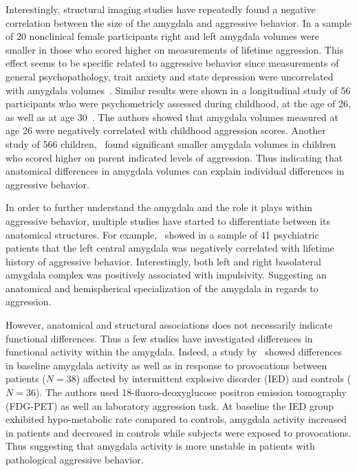 Interestingly, structural imaging studies have repeatedly found a negative correlation between the size of the amygdala and aggressive behavior.
In a sample of 20 nonclinical female participants right and left amygdala volumes were smaller in those who scored higher on measurements of lifetime aggression.
This effect seems to be specific related to aggressive behavior since measurements of general psychopathology, trait anxiety and state depression were uncorrelated with amygdala volumes~\cite{Matthies2012}.
Similar results were shown in a longitudinal study of 56 participants who were psychometricly assessed during childhood, at the age of 26, as well as at age 30~\cite{Pardini2014}.
The authors showed that amygdala volumes measured at age 26 were negatively correlated with childhood aggression scores.
Another study of 566 children,~\citet{Thijssen2015} found significant smaller amygdala volumes in children who scored higher on parent indicated levels of aggression.
Thus indicating that anatomical differences in amygdala volumes can explain individual differences in aggressive behavior.

In order to further understand the amygdala and the role it plays within aggressive behavior, multiple studies have started to differentiate between its anatomical structures.
For example,~\citet{Gopal2013} showed in a sample of 41 psychiatric patients that the left central amygdala was negatively correlated with lifetime history of aggressive behavior.
Interestingly, both left and right basolateral amygdala complex was positively associated with impulsivity.
Suggesting an anatomical and hemispherical specialization of the amygdala in regards to aggression.

However, anatomical and structural associations does not necessarily indicate functional differences.
Thus a few studies have investigated differences in functional activity within the amygdala.
Indeed, a study by~\citet{New2009} showed differences in baseline amygdala activity as well as in response to provocations between patients ($N=38$) affected by intermittent explosive disorder (IED) and controls ($N=36$).
The authors used 18-fluoro-deoxyglucose positron emission tomography (FDG-PET) as well an laboratory aggression task.
At baseline the IED group exhibited hypo-metabolic rate compared to controls, amygdala activity increased in patients and decreased in controls while subjects were exposed to provocations.
Thus suggesting that amygdala activity is more unstable in patients with pathological aggressive behavior.

